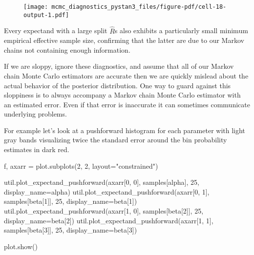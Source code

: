 \documentclass[
  letterpaper,
  DIV=11,
  numbers=noendperiod]{scrartcl}
\newenvironment{Shaded}{\begin{snugshade}}{\end{snugshade}}
\newcommand{\DecValTok}[1]{\textcolor[rgb]{0.68,0.00,0.00}{#1}}
\newcommand{\NormalTok}[1]{\textcolor[rgb]{0.00,0.23,0.31}{#1}}
\newcommand{\OperatorTok}[1]{\textcolor[rgb]{0.37,0.37,0.37}{#1}}
\newcommand{\StringTok}[1]{\textcolor[rgb]{0.13,0.47,0.30}{#1}}
\begin{document}
\begin{figure}[H]

{\centering \texttt{[image: mcmc\_diagnostics\_pystan3\_files/figure-pdf/cell-18-output-1.pdf]}

}

\end{figure}

Every expectand with a large split \(\hat{R}\)s also exhibits a
particularly small minimum empirical effective sample size, confirming
that the latter are due to our Markov chains not containing enough
information.

If we are sloppy, ignore these diagnostics, and assume that all of our
Markov chain Monte Carlo estimators are accurate then we are quickly
mislead about the actual behavior of the posterior distribution. One way
to guard against this sloppiness is to always accompany a Markov chain
Monte Carlo estimator with an estimated error. Even if that error is
inaccurate it can sometimes communicate underlying problems.

For example let's look at a pushforward histogram for each parameter
with light gray bands visualizing twice the standard error around the
bin probability estimates in dark red.

\begin{Shaded}
\begin{Highlighting}[]
\NormalTok{f, axarr }\OperatorTok{=}\NormalTok{ plot.subplots(}\DecValTok{2}\NormalTok{, }\DecValTok{2}\NormalTok{, layout}\OperatorTok{=}\StringTok{"constrained"}\NormalTok{)}

\NormalTok{util.plot\_expectand\_pushforward(axarr[}\DecValTok{0}\NormalTok{, }\DecValTok{0}\NormalTok{], samples[}\StringTok{\textquotesingle{}alpha\textquotesingle{}}\NormalTok{], }
                                \DecValTok{25}\NormalTok{, display\_name}\OperatorTok{=}\StringTok{\textquotesingle{}alpha\textquotesingle{}}\NormalTok{)}
\NormalTok{util.plot\_expectand\_pushforward(axarr[}\DecValTok{0}\NormalTok{, }\DecValTok{1}\NormalTok{], samples[}\StringTok{\textquotesingle{}beta[1]\textquotesingle{}}\NormalTok{], }
                                \DecValTok{25}\NormalTok{, display\_name}\OperatorTok{=}\StringTok{\textquotesingle{}beta[1]\textquotesingle{}}\NormalTok{)}
\NormalTok{util.plot\_expectand\_pushforward(axarr[}\DecValTok{1}\NormalTok{, }\DecValTok{0}\NormalTok{], samples[}\StringTok{\textquotesingle{}beta[2]\textquotesingle{}}\NormalTok{], }
                                \DecValTok{25}\NormalTok{, display\_name}\OperatorTok{=}\StringTok{\textquotesingle{}beta[2]\textquotesingle{}}\NormalTok{)}
\NormalTok{util.plot\_expectand\_pushforward(axarr[}\DecValTok{1}\NormalTok{, }\DecValTok{1}\NormalTok{], samples[}\StringTok{\textquotesingle{}beta[3]\textquotesingle{}}\NormalTok{], }
                                \DecValTok{25}\NormalTok{, display\_name}\OperatorTok{=}\StringTok{\textquotesingle{}beta[3]\textquotesingle{}}\NormalTok{)}

\NormalTok{plot.show()}
\end{Highlighting}
\end{Shaded}
\end{document}
